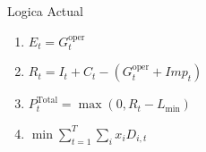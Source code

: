 \documentclass{beamer} %
\begin{document}
    \begin{frame}[t]{Logica Actual}
        \begin{enumerate}
            \item $E_t = G_t^{\text{oper}}$
            \item $R_t = I_t + C_t - (G_t^{\text{oper}}+Imp_t)$
            \item $P_t^{\text{Total}} = \max(0, R_t - L_{\min})$
            \item $\min \sum_{t=1}^T \sum_i x_i D_{i, t}$
        \end{enumerate}
    \end{frame}
\end{document}
